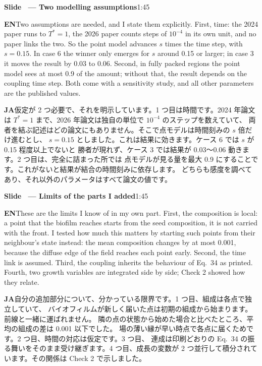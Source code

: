 \documentclass[11pt,a4paper]{article}
\newcounter{sl}
\newcommand{\slide}[2]{\stepcounter{sl}\vspace{8pt}%
  {\color{c3}\large\bfseries Slide \thesl\ --- #1}\hfill{\small #2}\par\vspace{2pt}}
\newcommand{\EN}{\textbf{EN}\quad}
\newcommand{\JA}{\par\textbf{JA}\quad}
\begin{document}
\slide{Two modelling assumptions}{1:45}
\EN Two assumptions are needed, and I state them explicitly. First, time: the
2024 paper runs to $T^*=1$, the 2026 paper counts steps of $10^{-4}$ in its own
unit, and no paper links the two. So the point model advances $s$ times the
time step, with $s=0.15$. In case 6 the winner only emerges for $s$ around
0.15 or larger; in case 3 it moves the result by 0.03 to 0.06. Second, in
fully packed regions the point model sees at most 0.9 of the amount; without
that, the result depends on the coupling time step. Both come with a
sensitivity study, and all other parameters are the published values.
\JA 仮定が 2 つ必要で、それを明示しています。1 つ目は時間です。2024 年論文は
$T^*=1$ まで、2026 年論文は独自の単位で $10^{-4}$ のステップを数えていて、
両者を結ぶ記述はどの論文にもありません。そこで点モデルは時間刻みの $s$ 倍だけ進むとし、
$s=0.15$ としました。これは結果に効きます。ケース 6 では $s$ が 0.15 程度以上でないと
勝者が現れず、ケース 3 では結果が 0.03〜0.06 動きます。2 つ目は、完全に詰まった所では
点モデルが見る量を最大 0.9 にすることです。これがないと結果が結合の時間刻みに依存します。
どちらも感度を調べてあり、それ以外のパラメータはすべて論文の値です。

\slide{Limits of the parts I added}{1:45}
\EN These are the limits I know of in my own part. First, the composition
is local: a point that the biofilm reaches starts from the seed composition,
it is not carried with the front. I tested how much this matters by
starting such points from their neighbour's state instead: the mean
composition changes by at most 0.001, because the diffuse edge of the field
reaches each point early. Second, the time link is assumed. Third, the
coupling inherits the behaviour of Eq.\ 34 as printed. Fourth, two growth
variables are integrated side by side; Check 2 showed how they relate.
\JA 自分の追加部分について、分かっている限界です。1 つ目、組成は各点で独立していて、
バイオフィルムが新しく届いた点は初期の組成から始まります。前線と一緒に運ばれません。
隣の点の状態から始めた場合と比べたところ、平均の組成の差は 0.001 以下でした。
場の薄い縁が早い時点で各点に届くためです。2 つ目、時間の対応は仮定です。3 つ目、
連成は印刷どおりの Eq.\ 34 の振る舞いをそのまま受け継ぎます。4 つ目、成長の変数が
2 つ並行して積分されています。その関係は Check 2 で示しました。
\end{document}
